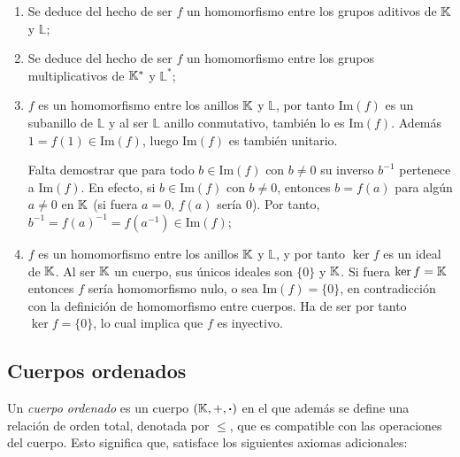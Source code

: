 \begin{fmd-proof}
\begin{enumerate}[label=\alph*)]
	\item Se deduce del hecho de ser $f$ un homomorfismo entre los grupos aditivos de $\mathbb{K}$ y $\mathbb{L}$;
	\item Se deduce del hecho de ser $f$ un homomorfismo entre los grupos multiplicativos de $\mathbb{K}^*$ y $\mathbb{L}^*$;
	\item $f$ es un homomorfismo entre los anillos $\mathbb{K}$ y $\mathbb{L}$, por tanto $\mbox{Im}(f)$ es un subanillo de $\mathbb{L}$ y al ser $\mathbb{L}$ anillo conmutativo, también lo es $\mbox{Im}(f)$. Además $1 = f(1) \in \mbox{Im}(f)$, luego $\mbox{Im}(f)$ es también unitario.
	
	Falta demostrar que para todo $b \in \mbox{Im}(f)$ con $b\ne 0$ su inverso $b^{-1}$ pertenece a $\mbox{Im}(f)$. En efecto, si $b \in \mbox{Im}(f)$ con $b \ne 0$, entonces $b = f(a)$ para algún $a \ne 0$ en $\mathbb{K}$ (si fuera $a=0$, $f(a)$ sería 0). Por tanto, $b^{-1} = f(a)^{-1} = f(a^{-1}) \in \mbox{Im}(f)$;
	
	\item $f$ es un homomorfismo entre los anillos $\mathbb{K}$ y $\mathbb{L}$, y por tanto $\ker f$ es un ideal de $\mathbb{K}$. Al ser $\mathbb{K}$ un cuerpo, sus únicos ideales son $\{0\}$ y $\mathbb{K}$. Si fuera $\ker f = \mathbb{K}$ entonces $f$ sería homomorfismo nulo, o sea $\mbox{Im}(f) = \{0\}$, en contradicción con la definición de homomorfismo entre cuerpos. Ha de ser por tanto $\ker f = \{0\}$, lo cual implica que $f$ es inyectivo.
\end{enumerate}
\end{fmd-proof}

\subsection{Cuerpos ordenados}

Un \textit{cuerpo ordenado} es un cuerpo $(\mathbb{K}, +, \boldsymbol{\cdot})$ en el que además se define una relación de orden total, denotada por $\leq$, que es compatible con las operaciones del cuerpo. Esto significa que, satisface los siguientes axiomas adicionales:

